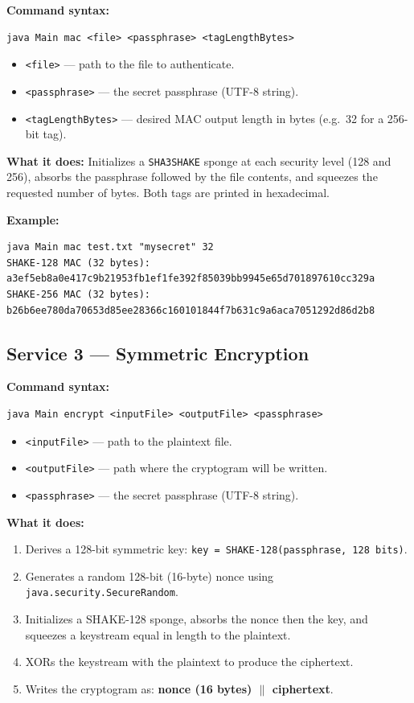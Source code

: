 \documentclass[11pt]{article}
\begin{document}
\textbf{Command syntax:}
\begin{lstlisting}
java Main mac <file> <passphrase> <tagLengthBytes>
\end{lstlisting}

\begin{itemize}[noitemsep]
  \item \texttt{<file>} --- path to the file to authenticate.
  \item \texttt{<passphrase>} --- the secret passphrase (UTF-8 string).
  \item \texttt{<tagLengthBytes>} --- desired MAC output length in bytes
        (e.g.\ 32 for a 256-bit tag).
\end{itemize}

\textbf{What it does:}
Initializes a \texttt{SHA3SHAKE} sponge at each security level (128 and 256),
absorbs the passphrase followed by the file contents, and squeezes the
requested number of bytes. Both tags are printed in hexadecimal.

\textbf{Example:}
\begin{lstlisting}
java Main mac test.txt "mysecret" 32
SHAKE-128 MAC (32 bytes): a3ef5eb8a0e417c9b21953fb1ef1fe392f85039bb9945e65d701897610cc329a
SHAKE-256 MAC (32 bytes): b26b6ee780da70653d85ee28366c160101844f7b631c9a6aca7051292d86d2b8
\end{lstlisting}

\subsection{Service 3 --- Symmetric Encryption}

\textbf{Command syntax:}
\begin{lstlisting}
java Main encrypt <inputFile> <outputFile> <passphrase>
\end{lstlisting}

\begin{itemize}[noitemsep]
  \item \texttt{<inputFile>} --- path to the plaintext file.
  \item \texttt{<outputFile>} --- path where the cryptogram will be written.
  \item \texttt{<passphrase>} --- the secret passphrase (UTF-8 string).
\end{itemize}

\textbf{What it does:}
\begin{enumerate}[noitemsep]
  \item Derives a 128-bit symmetric key:
        \texttt{key = SHAKE-128(passphrase, 128~bits)}.
  \item Generates a random 128-bit (16-byte) nonce using
        \texttt{java.security.SecureRandom}.
  \item Initializes a SHAKE-128 sponge, absorbs the nonce then the key, and
        squeezes a keystream equal in length to the plaintext.
  \item XORs the keystream with the plaintext to produce the ciphertext.
  \item Writes the cryptogram as: \textbf{nonce (16 bytes) $\|$ ciphertext}.
\end{enumerate}
\end{document}
